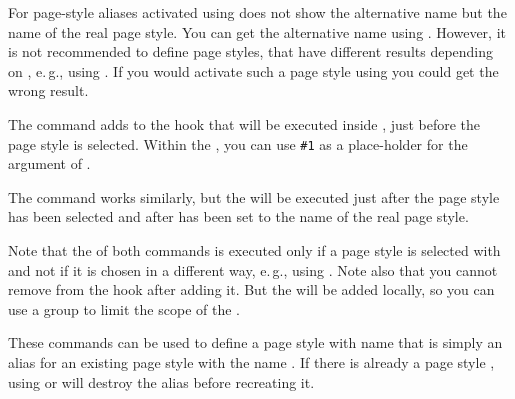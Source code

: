 For page-style aliases activated using 
 does not show the alternative name but the name of
the real page style. You can get the
alternative name using . However, it is not
recommended to define page styles, that have different results depending on
, e.\,g., using . If you
would activate such a page style using  you
could get the wrong result.%
\EndIndexGroup


\begin{Declaration}
\end{Declaration}
The  command adds  to the hook%
 that will be executed inside ,
just before the page style is selected. Within the , you can use
\texttt{\#1} as a place-holder for the argument of
.

The  command works similarly, but the
 will be executed just after the page style has been selected and
after  has been set to the name of
the real page style.

Note that the  of both commands is executed
only if a page style is selected with  and not
if it is chosen in a different way, e.\,g., using
. Note also that you cannot remove
 from the hook after adding it. But the  will be added
locally, so you can use a group to limit the scope of the .%
\EndIndexGroup


\begin{Declaration}
\end{Declaration}
%
%
These commands can be used to define a page style with name  that is simply an alias for an existing page style with the
name . If there is already a page style
, using  or
 will destroy the alias before recreating it.

